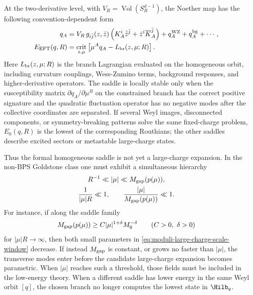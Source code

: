 At the two-derivative level, with \(V_R=\operatorname{Vol}(S_R^{d-1})\), the
Noether map has the following convention-dependent form
\begin{align}
  q_A
  &=
  V_R\,g_{i\bar j}(z,\bar z)
  \left(K_A^i\dot{\bar z}^{\bar j}
        +\dot z^i\overline{K}_A^{\bar j}\right)
  +q_A^{\rm WZ}+q_A^{\rm bg}
  +\cdots ,
  \label{eq:moduli-large-charge-noether-map}\\
  E_{\rm EFT}(q,R)
  &=
  \underset{z,\mu}{\operatorname{crit}}
  \left[
    \mu^A q_A
    -L_{\rm br}(z,\mu;R)
  \right] .
  \label{eq:moduli-large-charge-epsilon}
\end{align}
Here \(L_{\rm br}(z,\mu;R)\) is the branch Lagrangian evaluated on the
homogeneous orbit, including curvature couplings, Wess-Zumino terms,
background responses, and higher-derivative operators.  The saddle is
locally stable only when the susceptibility matrix
\(\partial q_A/\partial\mu^B\) on the constrained branch has the correct
positive signature and the quadratic fluctuation operator has no negative
modes after the collective coordinates are separated.  If several Weyl
images, disconnected components, or symmetry-breaking patterns solve the
same fixed-charge problem, \(E_0(q,R)\) is the lowest of the corresponding
Routhians; the other saddles describe excited sectors or metastable
large-charge states.

Thus the formal homogeneous saddle is not yet a large-charge expansion.  In
the non-BPS Goldstone class one must exhibit a simultaneous hierarchy
\begin{equation}
  \label{eq:moduli-large-charge-scale-window}
\begin{gathered}
  R^{-1}\ll |\mu|\ll M_{\rm gap}(p(\mu)),
  \\
  \frac{1}{|\mu|R}\ll1,\qquad
  \frac{|\mu|}{M_{\rm gap}(p(\mu))}\ll1 .
\end{gathered}
\end{equation}
For instance, if along the saddle family
\[
  M_{\rm gap}(p(\mu))\ge C|\mu|^{1+\delta}M_0^{-\delta}
  \qquad (C>0,\ \delta>0)
\]
for \(|\mu|R\to\infty\), then both small parameters in
\eqref{eq:moduli-large-charge-scale-window} decrease.  If instead
\(M_{\rm gap}\) is constant, or grows no faster than \(|\mu|\), the
transverse modes enter before the candidate large-charge expansion becomes
parametric.  When \(|\mu|\) reaches such a threshold, those fields must be
included in the low-energy theory.  When a different saddle has lower energy
in the same Weyl orbit \([q]\), the chosen branch no longer computes the
lowest state in \(\Hilb_q\).

